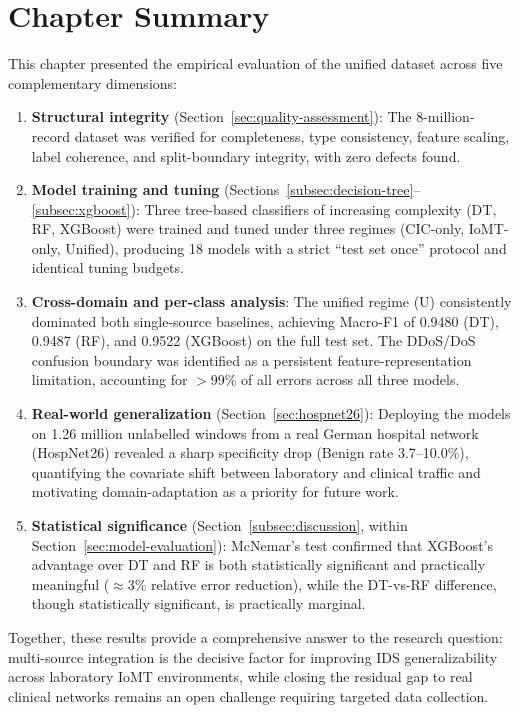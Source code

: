 \section{Chapter Summary}
\label{sec:experimentation-summary}

This chapter presented the empirical evaluation of the unified dataset across five complementary dimensions:

\begin{enumerate}[nosep]
  \item \textbf{Structural integrity} (Section~\ref{sec:quality-assessment}): The 8-million-record dataset was verified for completeness, type consistency, feature scaling, label coherence, and split-boundary integrity, with zero defects found.

  \item \textbf{Model training and tuning} (Sections~\ref{subsec:decision-tree}--\ref{subsec:xgboost}): Three tree-based classifiers of increasing complexity (DT, RF, XGBoost) were trained and tuned under three regimes (CIC-only, IoMT-only, Unified), producing 18 models with a strict ``test set once'' protocol and identical tuning budgets.

  \item \textbf{Cross-domain and per-class analysis}: The unified regime (U) consistently dominated both single-source baselines, achieving Macro-F1 of 0.9480 (DT), 0.9487 (RF), and 0.9522 (XGBoost) on the full test set. The DDoS/DoS confusion boundary was identified as a persistent feature-representation limitation, accounting for $>$99\% of all errors across all three models.

  \item \textbf{Real-world generalization} (Section~\ref{sec:hospnet26}): Deploying the models on 1.26 million unlabelled windows from a real German hospital network (HospNet26) revealed a sharp specificity drop (Benign rate 3.7--10.0\%), quantifying the covariate shift between laboratory and clinical traffic and motivating domain-adaptation as a priority for future work.

  \item \textbf{Statistical significance} (Section~\ref{subsec:discussion}, within Section~\ref{sec:model-evaluation}): McNemar's test confirmed that XGBoost's advantage over DT and RF is both statistically significant and practically meaningful ($\approx$3\% relative error reduction), while the DT-vs-RF difference, though statistically significant, is practically marginal.
\end{enumerate}

Together, these results provide a comprehensive answer to the research question: multi-source integration is the decisive factor for improving IDS generalizability across laboratory IoMT environments, while closing the residual gap to real clinical networks remains an open challenge requiring targeted data collection.
